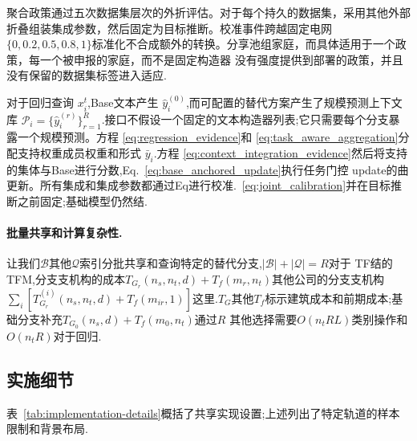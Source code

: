 聚合政策通过五次数据集层次的外折评估。对于每个持久的数据集，采用其他外部折叠组装集成参数，然后固定为目标推断。校准事件跨越固定电网$\{0,0.2,0.5,0.8,1\}$标准化不合成额外的转换。分享池组家庭，而具体适用于一个政策，每一个被申报的家庭，而不是固定构造器
没有强度提供到部署的政策，并且没有保留的数据集标签进入适应.

对于回归查询 $x_i^t$,Base文本产生 $\hat y_i^{(0)}$,而可配置的替代方案产生了规模预测上下文库 $\mathcal P_i=\{\hat y_i^{(r)}\}_{r=1}^{R}$.接口不假设一个固定的文本构造器列表;它只需要每个分支暴露一个规模预测。方程 \eqref{eq:regression_evidence}和 \eqref{eq:task_aware_aggregation}分配支持权重成员权重和形式 $\bar y_i$.方程
\eqref{eq:context_integration_evidence}然后将支持的集体与Base进行分数,Eq.~\eqref{eq:base_anchored_update}执行任务门控 update的曲更新。所有集成和集成参数都通过Eq进行校准.~\eqref{eq:joint_calibration}并在目标推断之前固定;基础模型仍然结.

\paragraph{批量共享和计算复杂性.}让我们$\mathcal B$其他$\mathcal Q$索引分批共享和查询特定的替代分支,$|\mathcal B|+|\mathcal Q|=R$对于 TF结的TFM,分支支机构的成本$T_{G_r}(n_s,n_t,d)+T_f(m_r,n_t)$其他公司的分支支机构$\sum_i[T_{G_r}^{(i)}(n_s,n_t,d)+T_f(m_{ir},1)]$这里.$T_G$其他$T_f$标示建筑成本和前期成本;基础分支补充$T_{G_0}(n_s,d)+T_f(m_0,n_t)$通过$R$
其他选择需要$O(n_tRL)$类别操作和$O(n_tR)$对于回归.

\subsection{实施细节}
\label{app:implementation_details}

表~\ref{tab:implementation-details}概括了共享实现设置;上述列出了特定轨道的样本限制和背景布局.

